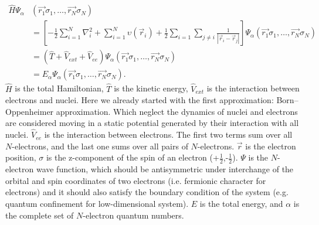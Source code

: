\begin{equation}\begin{aligned}
\hat{H}\mathit{\Psi}_\alpha &(\vec{r_1}\sigma_1,\ldots,\vec{r_N}\sigma_N) \\
&=\left[ -\frac{1}{2}\sum^N_{i=1}\nabla_i^2+\sum^N_{i=1}\upsilon(\vec{r}_i)+\frac{1}{2}\sum_{i=1}\sum_{j\neq i}\frac{1}{|\vec{r}_i-\vec{r}_j|}\right]\mathit{\Psi}_\alpha(\vec{r_1}\sigma_1,\ldots,\vec{r_N}\sigma_N)  \\
&=\left( \hat{T} + \hat{V}_{ext} + \hat{V}_{ee}\right)\mathit{\Psi}_\alpha(\vec{r_1}\sigma_1,\ldots,\vec{r_N}\sigma_N) \\
&=E_\alpha\mathit{\Psi}_\alpha(\vec{r_1}\sigma_1,\ldots,\vec{r_N}\sigma_N) .
\end{aligned}\end{equation}
$\hat{H}$ is the total Hamiltonian, $\hat{T}$ is the kinetic energy, $\hat{V}_{ext}$ is the interaction between electrons and nuclei. Here we already started with the first approximation: Born–Oppenheimer approximation\cite{Born1927}. Which neglect the dynamics of nuclei and electrons are considered moving in a static potential generated by their interaction with all nuclei. $\hat{V}_{ee}$ is the interaction between electrons. The first two terms sum over all $N$-electrons, and the last one sums over all pairs of $N$-electrons. $\vec{r}$ is the electron position, $\sigma$ is the z-component of the spin of an electron (+$\frac{1}{2}$,-$\frac{1}{2}$). $\mathit{\Psi}$ is the $N$-electron wave function, which should be antisymmetric under interchange of the orbital and spin coordinates of two electrons (i.e. fermionic character for electrons) and it should also satisfy the boundary condition of the system (e.g. quantum confinement for low-dimensional system). $E$ is the total energy, and $\alpha$ is the complete set of $N$-electron quantum numbers. 

